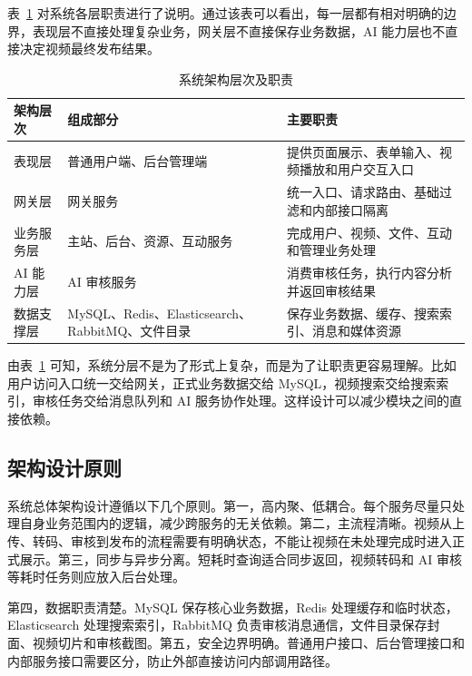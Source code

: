 表~\ref{tab:architecture-layers} 对系统各层职责进行了说明。通过该表可以看出，每一层都有相对明确的边界，表现层不直接处理复杂业务，网关层不直接保存业务数据，AI 能力层也不直接决定视频最终发布结果。

\begin{table}[htbp]
  \centering
  \caption{系统架构层次及职责}
  \label{tab:architecture-layers}
  \begin{tabular}{p{}p{}p{}}
    \hline
    \textbf{架构层次} & \textbf{组成部分} & \textbf{主要职责} \\
    \hline
    表现层 & 普通用户端、后台管理端 & 提供页面展示、表单输入、视频播放和用户交互入口 \\
    网关层 & 网关服务 & 统一入口、请求路由、基础过滤和内部接口隔离 \\
    业务服务层 & 主站、后台、资源、互动服务 & 完成用户、视频、文件、互动和管理业务处理 \\
    AI 能力层 & AI 审核服务 & 消费审核任务，执行内容分析并返回审核结果 \\
    数据支撑层 & MySQL、Redis、Elasticsearch、RabbitMQ、文件目录 & 保存业务数据、缓存、搜索索引、消息和媒体资源 \\
    \hline
  \end{tabular}
\end{table}

由表~\ref{tab:architecture-layers} 可知，系统分层不是为了形式上复杂，而是为了让职责更容易理解。比如用户访问入口统一交给网关，正式业务数据交给 MySQL，视频搜索交给搜索索引，审核任务交给消息队列和 AI 服务协作处理。这样设计可以减少模块之间的直接依赖。

\subsection{架构设计原则}
\label{subsec:architecture-principles}

系统总体架构设计遵循以下几个原则。第一，高内聚、低耦合。每个服务尽量只处理自身业务范围内的逻辑，减少跨服务的无关依赖。第二，主流程清晰。视频从上传、转码、审核到发布的流程需要有明确状态，不能让视频在未处理完成时进入正式展示。第三，同步与异步分离。短耗时查询适合同步返回，视频转码和 AI 审核等耗时任务则应放入后台处理。

第四，数据职责清楚。MySQL 保存核心业务数据，Redis 处理缓存和临时状态，Elasticsearch 处理搜索索引，RabbitMQ 负责审核消息通信，文件目录保存封面、视频切片和审核截图。第五，安全边界明确。普通用户接口、后台管理接口和内部服务接口需要区分，防止外部直接访问内部调用路径。


